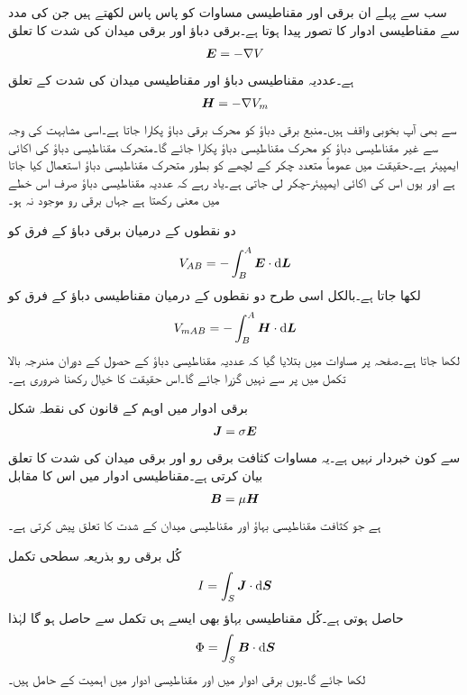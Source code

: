 سب سے پہلے ان برقی اور مقناطیسی مساوات کو پاس پاس لکھتے ہیں جن کی مدد سے مقناطیسی ادوار کا تصور پیدا ہوتا ہے۔برقی دباؤ اور برقی میدان کی شدت کا تعلق
\begin{align}
{\ensuremath{{\boldsymbol{E}}}}=-\nabla V
\end{align}
ہے۔عددیہ مقناطیسی دباؤ اور مقناطیسی میدان کی شدت کے تعلق
\begin{align}
{\ensuremath{{\boldsymbol{H}}}}=-\nabla V_m
\end{align}
سے بھی آپ بخوبی واقف ہیں۔منبع برقی دباؤ کو محرک برقی دباؤ پکارا جاتا ہے۔اسی مشابہت کی وجہ سے غیر مقناطیسی  دباؤ کو محرک مقناطیسی دباؤ پکارا جائے گا۔متحرک مقناطیسی دباؤ کی اکائی ایمپیئر ہے۔حقیقت میں عموماً متعدد چکر کے لچھے کو بطور متحرک مقناطیسی دباؤ استعمال کیا جاتا ہے اور  یوں اس کی اکائی ایمپیئر-چکر لی جاتی ہے۔یاد رہے کہ عددیہ مقناطیسی دباؤ صرف اس خطے میں معنی رکھتا ہے جہاں برقی رو موجود نہ ہو۔

دو نقطوں کے درمیان برقی دباؤ کے فرق کو
\begin{align}
V_{AB}=-\int_B^A \kvec{E} \cdot \dif \kvec{L}
\end{align}
لکھا جاتا ہے۔بالکل اسی طرح دو نقطوں کے درمیان مقناطیسی دباؤ کے فرق کو
\begin{align}
V_{mAB}=-\int_B^A \kvec{H} \cdot \dif \kvec{L}
\end{align}
لکھا جاتا ہے۔صفحہ  پر مساوات  میں بتلایا گیا کہ عددیہ مقناطیسی دباؤ کے حصول کے دوران مندرجہ بالا تکمل میں  پر سے نہیں گزرا جائے گا۔اس حقیقت کا خیال رکھنا ضروری ہے۔ 

برقی ادوار میں اوہم  کے قانون کی نقطہ شکل
\begin{align}
{\ensuremath{{\boldsymbol{J}}}}=\sigma {\ensuremath{{\boldsymbol{E}}}}
\end{align}
سے کون خبردار نہیں ہے۔یہ مساوات کثافت برقی رو اور برقی میدان کی شدت کا تعلق بیان کرتی ہے۔مقناطیسی ادوار میں اس کا مقابل
\begin{align}
{\ensuremath{{\boldsymbol{B}}}}=\mu {\ensuremath{{\boldsymbol{H}}}}
\end{align}
ہے جو کثافت مقناطیسی بہاؤ اور مقناطیسی میدان کے شدت کا تعلق پیش کرتی ہے۔

کُل برقی رو بذریعہ سطحی تکمل
\begin{align}
I=\int_S \kvec{J} \cdot \dif \kvec{S}
\end{align}
حاصل ہوتی ہے۔کُل مقناطیسی بہاؤ  بھی ایسے ہی تکمل سے حاصل ہو گا لہٰذا
\begin{align}
\Phi=\int_S \kvec{B} \cdot \dif \kvec{S}
\end{align}
لکھا جائے گا۔یوں برقی ادوار میں  اور مقناطیسی ادوار میں  اہمیت کے حامل ہیں۔

